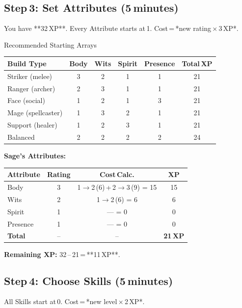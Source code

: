 \documentclass[10pt]{article}
\begin{document}
\subsection*{Step 3: Set Attributes (5 minutes)}
You have **32 XP**. Every Attribute starts at 1. Cost = *new rating × 3 XP*.

\begin{charbox}{Recommended Starting Arrays}
    \begin{tabular}{p{3cm} c c c c c}
        \toprule
        \textbf{Build Type} & \textbf{Body} & \textbf{Wits} & \textbf{Spirit} & \textbf{Presence} & \textbf{Total XP} \\
        \midrule
        Striker (melee) & 3 & 2 & 1 & 1 & 21 \\
        Ranger (archer) & 2 & 3 & 1 & 1 & 21 \\
        Face (social)   & 1 & 2 & 1 & 3 & 21 \\
        Mage (spellcaster) & 1 & 3 & 2 & 1 & 21 \\
        Support (healer) & 1 & 2 & 3 & 1 & 21 \\
        Balanced & 2 & 2 & 2 & 2 & 24 \\
        \bottomrule
    \end{tabular}
\end{charbox}

\textbf{Sage's Attributes:}
\begin{tabular}{p{3cm} c c c}
    \toprule
    \textbf{Attribute} & \textbf{Rating} & \textbf{Cost Calc.} & \textbf{XP} \\
    \midrule
    Body   & 3 & 1$\rightarrow$2 (6) + 2$\rightarrow$3 (9) = 15 & 15\\
    Wits   & 2 & 1$\rightarrow$2 (6) = 6 & 6\\
    Spirit & 1 & --- = 0 & 0\\
    Presence & 1 & --- = 0 & 0\\
    \midrule
    \textbf{Total} & -- & -- & \textbf{21 XP}\\
    \bottomrule
\end{tabular}
\textbf{Remaining XP:} 32 -- 21 = **11 XP**.

\subsection*{Step 4: Choose Skills (5 minutes)}
All Skills start at 0. Cost = *new level × 2 XP*.
\end{document}
